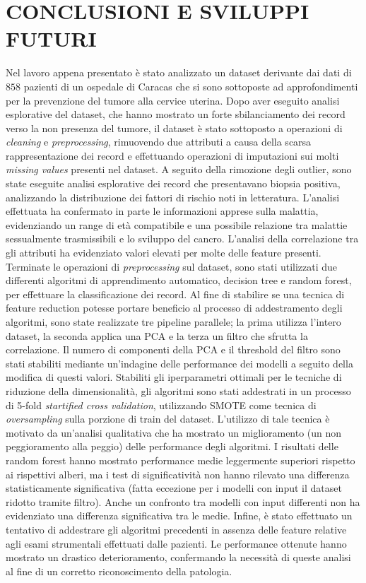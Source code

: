 \section{CONCLUSIONI E SVILUPPI FUTURI}
Nel lavoro appena presentato è stato analizzato un dataset derivante dai dati di $858$ pazienti di un ospedale di Caracas che si sono sottoposte ad approfondimenti per la prevenzione del tumore alla cervice uterina.
Dopo aver eseguito analisi esplorative del dataset, che hanno mostrato un forte sbilanciamento dei record verso la non presenza del tumore, il dataset è stato sottoposto a operazioni di \textit{cleaning} e \textit{preprocessing}, rimuovendo due attributi a causa della scarsa rappresentazione dei record e effettuando operazioni di imputazioni sui molti \textit{missing values} presenti nel dataset.
A seguito della rimozione degli outlier, sono state eseguite analisi esplorative dei record che presentavano biopsia positiva, analizzando la distribuzione dei fattori di rischio noti in letteratura.
L'analisi effettuata ha confermato in parte le informazioni apprese sulla malattia, evidenziando un range di età compatibile e una possibile relazione tra malattie sessualmente trasmissibili e lo sviluppo del cancro.
L'analisi della correlazione tra gli attributi ha evidenziato valori elevati per molte delle feature presenti.\\
Terminate le operazioni di \textit{preprocessing} sul dataset, sono stati utilizzati due differenti algoritmi di apprendimento automatico, decision tree e random forest, per effettuare la classificazione dei record.
Al fine di stabilire se una tecnica di feature reduction potesse portare beneficio al processo di addestramento degli algoritmi, sono state realizzate tre pipeline parallele; la prima utilizza l'intero dataset, la seconda applica una PCA e la terza un filtro che sfrutta la correlazione.
Il numero di componenti della PCA e il threshold del filtro sono stati stabiliti mediante un'indagine delle performance dei modelli a seguito della modifica di questi valori.
Stabiliti gli iperparametri ottimali per le tecniche di riduzione della dimensionalità, gli algoritmi sono stati addestrati in un processo di 5-fold \textit{startified cross validation}, utilizzando SMOTE come tecnica di \textit{oversampling} sulla porzione di train del dataset.
L'utilizzo di tale tecnica è motivato da un'analisi qualitativa che ha mostrato un miglioramento (un non peggioramento alla peggio) delle performance degli algoritmi.
I risultati delle random forest hanno mostrato performance medie leggermente superiori rispetto ai rispettivi alberi, ma i test di significatività non hanno rilevato una differenza statisticamente significativa (fatta eccezione per i modelli con input il dataset ridotto tramite filtro). Anche un confronto tra modelli con input differenti non ha evidenziato una differenza significativa tra le medie.
Infine, è stato effettuato un tentativo di addestrare gli algoritmi precedenti in assenza delle feature relative agli esami strumentali effettuati dalle pazienti. Le performance ottenute hanno mostrato un drastico deterioramento, confermando la necessità di queste analisi al fine di un corretto riconoscimento della patologia.\\

